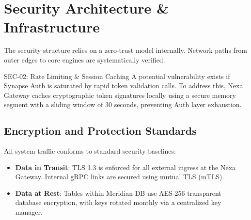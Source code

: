 \section{Security Architecture \& Infrastructure}
The security structure relies on a zero-trust model internally. Network paths from outer edges to core engines are systematically verified.

\begin{securityrisk}{SEC-02: Rate Limiting \& Session Caching}
A potential vulnerability exists if Synapse Auth is saturated by rapid token validation calls. To address this, Nexa Gateway caches cryptographic token signatures locally using a secure memory segment with a sliding window of 30 seconds, preventing Auth layer exhaustion.
\end{securityrisk}

\subsection{Encryption and Protection Standards}
All system traffic conforms to standard security baselines:
\begin{itemize}
  \item \textbf{Data in Transit}: TLS 1.3 is enforced for all external ingress at the Nexa Gateway. Internal gRPC links are secured using mutual TLS (mTLS).
  \item \textbf{Data at Rest}: Tables within Meridian DB use AES-256 transparent database encryption, with keys rotated monthly via a centralized key manager.
\end{itemize}
